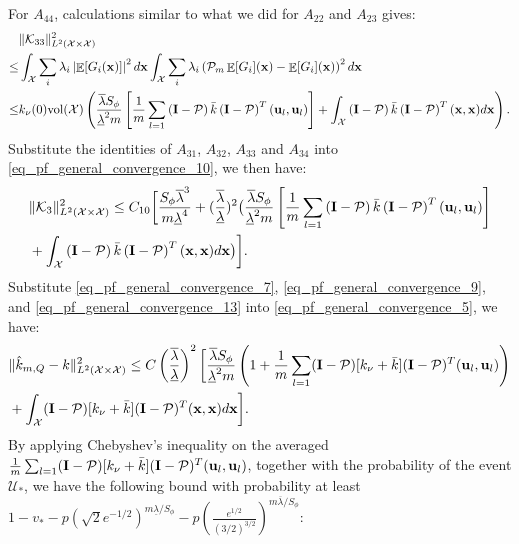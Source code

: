 \documentclass[aos,preprint]{imsart}
\theoremstyle{plain}
\DeclareMathOperator{\E}{\mathbb E}
\newcommand{\CalX}{\mathcal X}
\newcommand{\CalP}{\mathcal P}
\newcommand{\CalU}{\mathcal U}
\newcommand{\CalK}{\mathcal K}
\newcommand{\Bx}{\bold x}
\newcommand{\BFx}{\bold x}
\newcommand{\BB}{\bold B}
\newcommand{\Bu}{\bold u}
\theoremstyle{remark}
\begin{document}
\begin{appendix}
For $A_{44}$, calculations similar to what we did for $A_{22}$ and $A_{23}$ gives:
\begin{align*}
    &\|\CalK_{33}\|^2_{L^2(\CalX\times\CalX)}\\ 
     \leq &  \int_{\CalX}\sum_i\lambda_i \left|\E [G_i(\BFx)]\right|^2d\BFx \int_\CalX\sum_i\lambda_i\left(\CalP_m\E[G_i](\Bx)-\E[G_i](\Bx)\right)^2d\Bx \\
     \leq & k_\nu(0)\text{vol}(\CalX)\left(\frac{\overline{\lambda}S_\phi}{\underline{\lambda}^2m}\left[\frac{1}{m}\sum_{l=1}\left(\bold{I}-\CalP\right)\bar{k}\left(\bold{I}-\CalP\right)^T(\Bu_l,\Bu_l)\right]+\int_\CalX\left(\bold{I}-\CalP\right)\bar{k}\left(\bold{I}-\CalP\right)^T(\BFx,\BFx)d\Bx\right).
\end{align*}
Substitute the identities of $A_{31}$, $A_{32}$, $A_{33}$ and $A_{34}$ into \eqref{eq_pf_general_convergence_10}, we then have:
\begin{align}\label{eq_pf_general_convergence_13}
    &\|\CalK_3\|^2_{L^2(\CalX\times\CalX)}\leq  C_{10}\bigg[\frac{S_\phi\overline{\lambda}^3}{m\underline{\lambda}^4}+(\frac{\overline{\lambda}}{\underline{\lambda}})^2\big(\frac{\overline{\lambda}S_\phi}{\underline{\lambda}^2m}\left[\frac{1}{m}\sum_{l=1}\left(\bold{I}-\CalP\right)\bar{k}\left(\bold{I}-\CalP\right)^T(\Bu_l,\Bu_l)\right]\\
    &+\int_\CalX\left(\bold{I}-\CalP\right)\bar{k}\left(\bold{I}-\CalP\right)^T(\BFx,\BFx)d\Bx\big)\bigg]\nonumber.
\end{align}
Substitute   \eqref{eq_pf_general_convergence_7}, \eqref{eq_pf_general_convergence_9}, and \eqref{eq_pf_general_convergence_13} into \eqref{eq_pf_general_convergence_5}, we have:
\begin{align}
   &\|\hat{k}_{m,Q}-k\|_{L^2(\CalX\times\CalX)}^2\leq C\left(\frac{\overline{\lambda}}{\underline{\lambda}}\right)^2\bigg[\frac{\overline{\lambda}S_\phi}{\underline{\lambda}^2m}\left(1+\frac{1}{m}\sum_{l=1} (\bold{I}-\CalP)[k_\nu+\bar{k}](\bold{I}-\CalP)^T(\Bu_l,\Bu_l) \right)\nonumber\\
    &+\int_\CalX(\bold{I}-\CalP)[k_\nu+\bar{k}](\bold{I}-\CalP)^T(\Bx,\Bx)d\Bx\bigg].
\end{align}
By applying Chebyshev's inequality on the averaged $\frac{1}{m}\sum_{l=1} (\bold{I}-\CalP)[k_\nu+\bar{k}](\bold{I}-\CalP)^T(\Bu_l,\Bu_l)$, together with the probability of the event $\CalU_*$, we have the following bound with probability at least $1-v_*-p(\sqrt{2}e^{-1/2})^{m\underline{\lambda}/S_\phi}-p(\frac{e^{1/2}}{(3/2)^{3/2}})^{m\overline{\lambda}/S_\phi}$:

\end{appendix}
\end{document}
